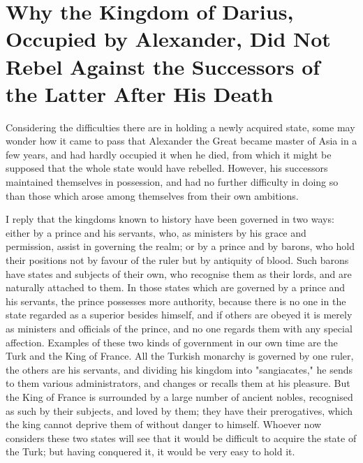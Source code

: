 \documentclass[12pt,letterpaper]{memoir}
\begin{document}
\chapter{Why the Kingdom of Darius, Occupied by Alexander, Did Not Rebel Against the Successors of the Latter After His Death}

Considering the difficulties there are in holding a newly acquired
state, some may wonder how it came to pass that Alexander the Great
became master of Asia in a few years, and had hardly occupied it
when he died, from which it might be supposed that the whole state
would have rebelled. However, his successors maintained themselves in
possession, and had no further difficulty in doing so than those which
arose among themselves from their own ambitions.

I reply that the kingdoms known to history have been governed in two
ways: either by a prince and his servants, who, as ministers by his
grace and permission, assist in governing the realm; or by a prince
and by barons, who hold their positions not by favour of the ruler but
by antiquity of blood. Such barons have states and subjects of their
own, who recognise them as their lords, and are naturally attached to
them. In those states which are governed by a prince and his servants,
the prince possesses more authority, because there is no one in the
state regarded as a superior besides himself, and if others are obeyed
it is merely as ministers and officials of the prince, and no one
regards them with any special affection. Examples of these two kinds
of government in our own time are the Turk and the King of France.
All the Turkish monarchy is governed by one ruler, the others are his
servants, and dividing his kingdom into "sangiacates," he sends to them
various administrators, and changes or recalls them at his pleasure.
But the King of France is surrounded by a large number of ancient
nobles, recognised as such by their subjects, and loved by them; they
have their prerogatives, which the king cannot deprive them of without
danger to himself. Whoever now considers these two states will see that
it would be difficult to acquire the state of the Turk; but having
conquered it, it would be very easy to hold it.
\end{document}
